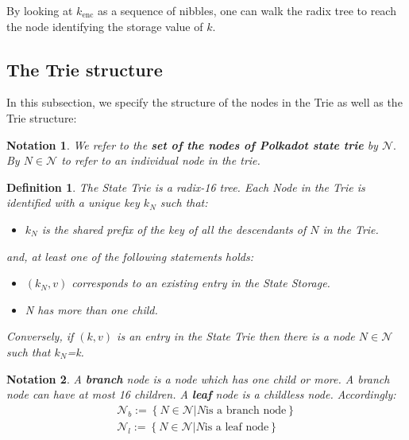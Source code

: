 \documentclass{article}
\newcommand{\assign}{:=}
\newcommand{\tmop}[1]{\ensuremath{\operatorname{#1}}}
\newcommand{\tmstrong}[1]{\textbf{#1}}
\newcommand{\tmtextbf}[1]{{\bfseries{#1}}}
\newenvironment{itemizeminus}{\begin{itemize} \renewcommand{\labelitemi}{$-$}\renewcommand{\labelitemii}{$-$}\renewcommand{\labelitemiii}{$-$}\renewcommand{\labelitemiv}{$-$}}{\end{itemize}}
\newtheorem{definition}{Definition}
\newtheorem{notation}{Notation}
\providecommand{\tmop}[1]{\ensuremath{\mathrm{#1}}}
\providecommand{\tmstrong}[1]{\tmtextbf{#1}}
\providecommand{\tmtextbf}[1]{\tmtextbf{#1}}
\newtheorem{definition}{Definition}
\newtheorem{notation}{Notation}
\begin{document}
By looking at $k_{\tmop{enc}}$ as a sequence of nibbles, one can walk the
radix tree to reach the node identifying the storage value of $k$.

\subsection{The Trie structure}

In this subsection, we specify the structure of the nodes in the Trie as well
as the Trie structure:

\begin{notation}
  We refer to the {\tmstrong{set of the nodes of Polkadot state trie}} by
  $\mathcal{N}.$ By $N \in \mathcal{N}$ to refer to an individual node in the
  trie.
\end{notation}

\begin{definition}
  \label{defn-nodetype}The State Trie is a radix-16 tree. Each Node in the
  Trie is identified with a unique key $k_N$ such that:
  \begin{itemizeminus}
    \item $k_N$ is the shared prefix of the key of all the descendants of $N$
    in the Trie.
  \end{itemizeminus}
  and, at least one of the following statements holds:
  \begin{itemizeminus}
    \item $(k_N, v)$ corresponds to an existing entry in the State Storage.
    
    \item N has more than one child.
  \end{itemizeminus}
  Conversely, if $(k, v)$ is an entry in the State Trie then there is a node
  $N \in \mathcal{N}$ such that $k_N$=k.
\end{definition}

\begin{notation}
  A {\tmstrong{branch}} node is a node which has one child or more. A branch
  node can have at most 16 children. A {\tmstrong{leaf}} node is a childless
  node. Accordingly:
  \[ \begin{array}{c}
       \mathcal{N}_b \assign \left\{ N \in \mathcal{N}|N \text{is a branch
       node} \right\}\\
       \mathcal{N}_l \assign \left\{ N \in \mathcal{N}|N \text{is a leaf node}
       \right\}
     \end{array} \]
\end{notation}
\end{document}
